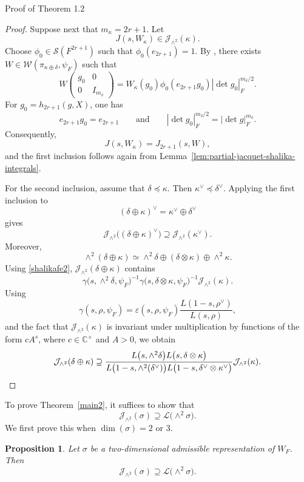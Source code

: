 \documentclass[12pt,reqno]{amsart}
\numberwithin{equation}{section}%
\numberwithin{equation}{subsection}
\newtheorem{prop}[equation]{Proposition}
\theoremstyle{definition}
\theoremstyle{remark}
\begin{document}
\begin{section}{Proof of Theorem 1.2}
\begin{proof}
Suppose next that $m_\kappa=2r+1$. Let
\[
J(s,W_\kappa)
\in
\mathcal{J}_{\wedge^2}(\kappa).
\]
Choose $\phi_0\in\mathcal{S}(F^{2r+1})$ such that $\phi_0(e_{2r+1})=1.$ By \cite[Proposition~14.1]{Jac2009}, there exists
$W\in\mathcal{W}(\pi_{\kappa\oplus\delta},\psi_F)$ such that
\[
W
\begin{pmatrix}
g_0&0\\
0&I_{m_\delta}
\end{pmatrix}
=
W_\kappa(g_0)\phi_0(e_{2r+1}g_0)
|\det g_0|_F^{m_\delta/2}.
\]
For $g_0=h_{2r+1}(g,X)$, one has
\[
e_{2r+1}g_0=e_{2r+1}
\qquad\text{and}\qquad
|\det g_0|_F^{m_\delta/2}=|\det g|_F^{m_\delta}.
\]
Consequently,
\[
J(s,W_\kappa)=J_{2r+1}(s,W),
\]
and the first inclusion follows again from
Lemma~\ref{lem:partial-jacquet-shalika-integrals}.

For the second inclusion, assume that $\delta\preceq\kappa$. Then $\kappa^\vee\preceq\delta^\vee.$ Applying the first inclusion to
\[
(\delta\oplus\kappa)^\vee
=
\kappa^\vee\oplus\delta^\vee
\]
gives
\[
\mathcal{J}_{\wedge^2}
\bigl((\delta\oplus\kappa)^\vee\bigr)
\supseteq
\mathcal{J}_{\wedge^2}(\kappa^\vee).
\]
Moreover,
\[
\wedge^2(\delta\oplus\kappa)
\simeq
\wedge^2\delta
\oplus
(\delta\otimes\kappa)
\oplus
\wedge^2\kappa.
\]
Using \eqref{shalikafe2},  
$\mathcal{J}_{\wedge^2}(\delta\oplus\kappa)$ contains
\[
\gamma\bigl(s,\wedge^2\delta,\psi_F\bigr)^{-1}
\gamma\bigl(s,\delta\otimes\kappa,\psi_F\bigr)^{-1}
\mathcal{J}_{\wedge^2}(\kappa).
\]
Using
\[
\gamma(s,\rho,\psi_F)
=
\varepsilon(s,\rho,\psi_F)
\frac{L(1-s,\rho^\vee)}{L(s,\rho)},
\]
and the fact that $\mathcal{J}_{\wedge^2}(\kappa)$ is invariant under multiplication by functions of the form \(cA^s\), where
\(c\in\mathbb{C}^{\times}\) and \(A>0\), we obtain
\[
\mathcal{J}_{\wedge^2}(\delta\oplus\kappa)
\supseteq
\frac{
L\bigl(s,\wedge^2\delta\bigr)
L\bigl(s,\delta\otimes\kappa\bigr)
}{
L\bigl(1-s,\wedge^2(\delta^\vee)\bigr)
L\bigl(1-s,\delta^\vee\otimes\kappa^\vee\bigr)
}
\mathcal{J}_{\wedge^2}(\kappa).\qedhere
\]
\end{proof}

To prove Theorem~\ref{main2}, it suffices to show that
\[
\mathcal{J}_{\wedge^2}(\sigma)
\supseteq
\mathcal{L}\bigl(\wedge^2\sigma\bigr).
\]
We first prove this when \(\dim(\sigma)=2\) or \(3\).

\begin{prop}
\label{prop:exterior-square-rank-two}
Let $\sigma$ be a two-dimensional admissible representation of $W_F$.
Then
\[
\mathcal{J}_{\wedge^2}(\sigma)
\supseteq
\mathcal{L}\bigl(\wedge^2\sigma\bigr).
\]
\end{prop}


\end{section}
\end{document}
